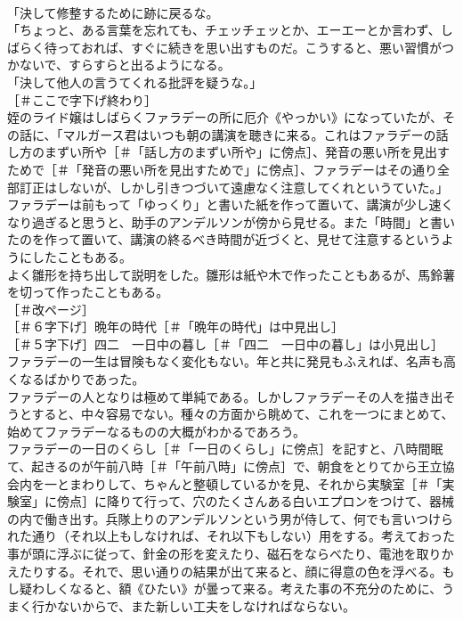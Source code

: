 \documentclass[8pt]{extreport}
\begin{document}
\begin{CJK}{UTF8}{min}
\\	「決して修整するために跡に戻るな。
\\	「ちょっと、ある言葉を忘れても、チェッチェッとか、エーエーとか言わず、しばらく待っておれば、すぐに続きを思い出すものだ。こうすると、悪い習慣がつかないで、すらすらと出るようになる。
\\	「決して他人の言うてくれる批評を疑うな。」
\\	［＃ここで字下げ終わり］
\\	姪のライド嬢はしばらくファラデーの所に厄介《やっかい》になっていたが、その話に、「マルガース君はいつも朝の講演を聴きに来る。これはファラデーの話し方のまずい所や［＃「話し方のまずい所や」に傍点］、発音の悪い所を見出すためで［＃「発音の悪い所を見出すためで」に傍点］、ファラデーはその通り全部訂正はしないが、しかし引きつづいて遠慮なく注意してくれというていた。」
\\	ファラデーは前もって「ゆっくり」と書いた紙を作って置いて、講演が少し速くなり過ぎると思うと、助手のアンデルソンが傍から見せる。また「時間」と書いたのを作って置いて、講演の終るべき時間が近づくと、見せて注意するというようにしたこともある。
\\	よく雛形を持ち出して説明をした。雛形は紙や木で作ったこともあるが、馬鈴薯を切って作ったこともある。
\\	［＃改ページ］
\\	［＃６字下げ］晩年の時代［＃「晩年の時代」は中見出し］
\\	［＃５字下げ］四二　一日中の暮し［＃「四二　一日中の暮し」は小見出し］
\\	ファラデーの一生は冒険もなく変化もない。年と共に発見もふえれば、名声も高くなるばかりであった。
\\	ファラデーの人となりは極めて単純である。しかしファラデーその人を描き出そうとすると、中々容易でない。種々の方面から眺めて、これを一つにまとめて、始めてファラデーなるものの大概がわかるであろう。
\\	ファラデーの一日のくらし［＃「一日のくらし」に傍点］を記すと、八時間眠て、起きるのが午前八時［＃「午前八時」に傍点］で、朝食をとりてから王立協会内を一とまわりして、ちゃんと整頓しているかを見、それから実験室［＃「実験室」に傍点］に降りて行って、穴のたくさんある白いエプロンをつけて、器械の内で働き出す。兵隊上りのアンデルソンという男が侍して、何でも言いつけられた通り（それ以上もしなければ、それ以下もしない）用をする。考えておった事が頭に浮ぶに従って、針金の形を変えたり、磁石をならべたり、電池を取りかえたりする。それで、思い通りの結果が出て来ると、顔に得意の色を浮べる。もし疑わしくなると、額《ひたい》が曇って来る。考えた事の不充分のために、うまく行かないからで、また新しい工夫をしなければならない。

\end{CJK}
\end{document}
